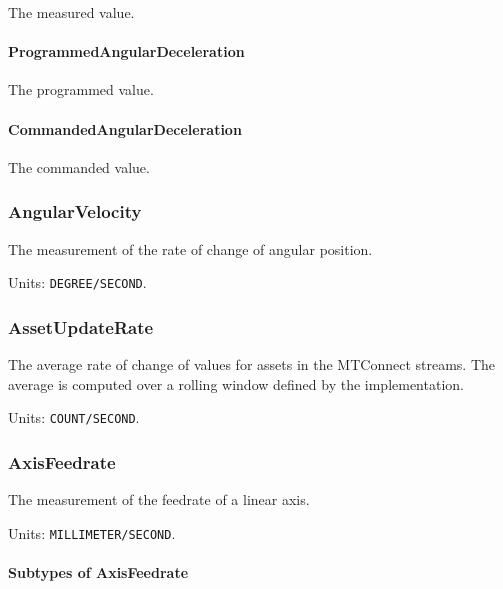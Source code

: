 The measured value.


\paragraph{ProgrammedAngularDeceleration}\mbox{}
\label{sec:ProgrammedAngularDeceleration}


The programmed value.


\paragraph{CommandedAngularDeceleration}\mbox{}
\label{sec:CommandedAngularDeceleration}


The commanded value.


\subsubsection{AngularVelocity}
\label{sec:AngularVelocity}



The measurement of the rate of change of angular position.


Units: \texttt{DEGREE/SECOND}.

\subsubsection{AssetUpdateRate}
\label{sec:AssetUpdateRate}



The average rate of change of values for assets in the MTConnect streams. The average is computed over a rolling window defined by the implementation.


Units: \texttt{COUNT/SECOND}.

\subsubsection{AxisFeedrate}
\label{sec:AxisFeedrate}



The measurement of the feedrate of a linear axis.


Units: \texttt{MILLIMETER/SECOND}.

\paragraph{Subtypes of AxisFeedrate}\mbox{}
\label{sec:Subtypes of AxisFeedrate}

